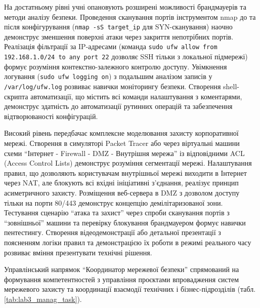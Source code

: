 На достатньому рівні учні опановують розширені можливості брандмауерів та методи аналізу безпеки. Проведення сканування портів інструментом nmap до та після конфігурування (\texttt{nmap -sS target\_ip} для SYN-сканування) наочно демонструє зменшення поверхні атаки через закриття непотрібних портів. Реалізація фільтрації за IP-адресами (команда \texttt{sudo ufw allow from 192.168.1.0/24 to any port 22} дозволяє SSH тільки з локальної підмережі) формує розуміння контекстно-залежного контролю доступу. Увімкнення логування (\texttt{sudo ufw logging on}) з подальшим аналізом записів у \texttt{/var/log/ufw.log} розвиває навички моніторингу безпеки. Створення shell-скрипта автоматизації, що містить всі команди налаштування з коментарями, демонструє здатність до автоматизації рутинних операцій та забезпечення відтворюваності конфігурацій.

Високий рівень передбачає комплексне моделювання захисту корпоративної мережі. Створення в симуляторі Packet Tracer або через віртуальні машини схеми ``Інтернет - Firewall - DMZ - Внутрішня мережа'' із відповідними ACL (Access Control Lists) демонструє розуміння сегментації мережі. Налаштування правил, що дозволяють користувачам внутрішньої мережі виходити в Інтернет через NAT, але блокують всі вхідні ініціативні з'єднання, реалізує принцип асиметричного захисту. Розміщення веб-сервера в DMZ з дозволом доступу тільки на порти 80/443 демонструє концепцію демілітаризованої зони. Тестування сценарію ``атака та захист'' через спроби сканування портів з ``зовнішньої'' машини та перевірку блокування брандмауером формує навички пентестингу. Створення відеодемонстрації або детальної презентації з поясненням логіки правил та демонстрацією їх роботи в режимі реального часу розвиває вміння презентувати технічні рішення.

Управлінський напрямок ``Координатор мережевої безпеки'' спрямований на формування компетентностей з управління проєктами впровадження систем мережевого захисту та координації взаємодії технічних і бізнес-підрозділів (табл. \ref{tab:lab3_manag_task}).


